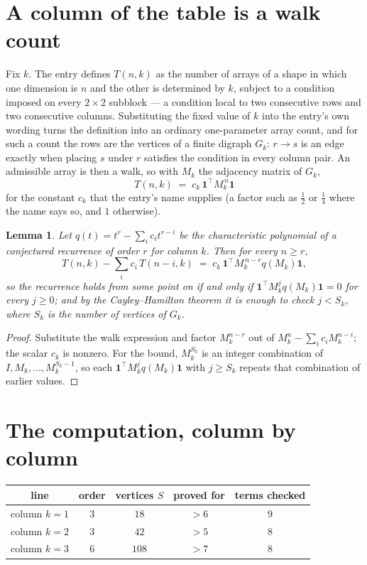 \documentclass[11pt,a4paper]{article}
\theoremstyle{plain}
\newtheorem{lemma}[theorem]{Lemma}
\theoremstyle{definition}
\begin{document}
\section{A column of the table is a walk count}

Fix $k$. The entry defines $T(n,k)$ as the number of arrays of a shape in which one dimension
is $n$ and the other is determined by $k$, subject to a condition imposed on every
$2\times2$ subblock --- a condition local to two consecutive rows and two consecutive columns.
Substituting the fixed value of $k$ into the entry's own wording turns the definition into an
ordinary one-parameter array count, and for such a count the rows are the vertices of a finite
digraph $G_k$: $r\to s$ is an edge exactly when placing $s$ under $r$ satisfies the condition
in every column pair. An admissible array is then a walk, so with $M_k$ the adjacency matrix
of $G_k$,
\[
T(n,k)\;=\;c_k\,\mathbf{1}^{\!\top}M_k^{\,n}\mathbf{1}
\]
for the constant $c_k$ that the entry's name supplies (a factor such as $\tfrac12$ or
$\tfrac14$ where the name says so, and $1$ otherwise).

\begin{lemma}\label{lem:crit}
Let $q(t)=t^{r}-\sum_i c_it^{r-i}$ be the characteristic polynomial of a conjectured
recurrence of order $r$ for column $k$. Then for every $n\ge r$,
\[
T(n,k)-\sum_i c_i\,T(n-i,k)\;=\;c_k\,\mathbf{1}^{\!\top}M_k^{\,n-r}q(M_k)\mathbf{1},
\]
so the recurrence holds from some point on if and only if
$\mathbf{1}^{\!\top}M_k^{j}q(M_k)\mathbf{1}=0$ for every $j\ge0$; and by the
Cayley--Hamilton theorem it is enough to check $j<S_k$, where $S_k$ is the number of vertices
of $G_k$.
\end{lemma}

\begin{proof}
Substitute the walk expression and factor $M_k^{n-r}$ out of $M_k^{n}-\sum_ic_iM_k^{n-i}$;
the scalar $c_k$ is nonzero. For the bound, $M_k^{S_k}$ is an integer combination of
$I,M_k,\dots,M_k^{S_k-1}$, so each $\mathbf{1}^{\!\top}M_k^{j}q(M_k)\mathbf{1}$ with
$j\ge S_k$ repeats that combination of earlier values.
\end{proof}

\section{The computation, column by column}

\begin{center}
\begin{tabular}{ccccc}
line & order & vertices $S$ & proved for & terms checked \\ \hline
column $k$$=1$ & $3$ & $18$ & $>6$ & $9$ \\
column $k$$=2$ & $3$ & $42$ & $>5$ & $8$ \\
column $k$$=3$ & $6$ & $108$ & $>7$ & $8$ \\
\end{tabular}
\end{center}
\end{document}

